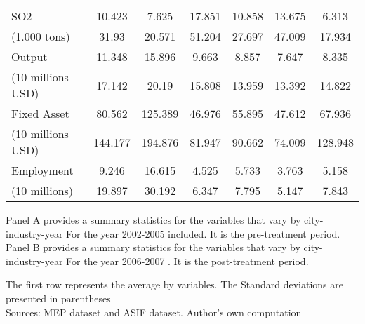 \documentclass[
  convert={
    density=800 -alpha deactivate,
    size=1080x800,
    outext=.png
  },
]{standalone}
\begin{document}
\begin{table}[htbp]
{\begin{threeparttable}
\begin{tabular}{l*{6}{c}}
    SO2	&10.423&	7.625&	17.851	&10.858&	13.675&	6.313\\
    (1.000 tons)	&31.93	&20.571	&51.204&	27.697	&47.009	&17.934\\
    Output&	11.348&	15.896	&9.663	&8.857&	7.647&	8.335\\
    (10 millions USD)&	17.142&	20.19	&15.808	&13.959	&13.392&	14.822\\
    Fixed Asset&	80.562&	125.389	&46.976	&55.895&	47.612&	67.936\\
    (10 millions USD)&	144.177&	194.876	&81.947&	90.662&	74.009&	128.948\\
    Employment&	9.246	&16.615	&4.525	&5.733&	3.763&	5.158\\
    (10 millions)	&19.897&	30.192	&6.347	&7.795&	5.147&	7.843\\
    \bottomrule

  \end{tabular}
  \begin{tablenotes}
      \small
      \item Panel A provides a summary statistics for the variables that vary by city-industry-year For the year 2002-2005 included. It is the pre-treatment period. Panel B provides a summary statistics for the variables that vary by city-industry-year For the year 2006-2007 . It is the post-treatment period.
      
      The first row represents the average by variables. The Standard deviations are presented in parentheses \\
      Sources: MEP dataset and ASIF dataset. Author's own computation 
    \end{tablenotes}
    \label{tab:appendixperiod}
\end{threeparttable}}
\end{table}
\end{document}

